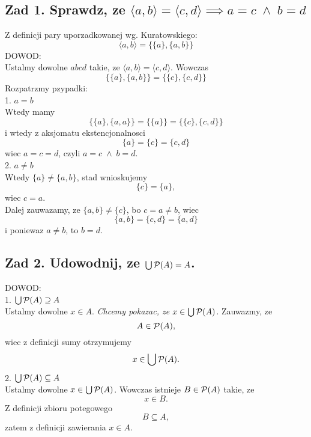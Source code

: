 \documentclass{article}
\begin{document}
\ttfamily
\subsection*{Zad 1. Sprawdz, ze $\langle a, b\rangle = \langle c,d\rangle\implies a=c\;\land\;b=d$}
    Z definicji pary uporzadkowanej wg. Kuratowskiego:
    $$\langle a,b\rangle = \{\{a\}, \{a,b\}\}$$
    DOWOD:\medskip\\
    Ustalmy dowolne $abcd$ takie, ze $\langle a,b\rangle =\langle c,d\rangle$. Wowczas
    $$\{\{a\},\{a,b\}\}=\{\{c\}, \{c,d\}\}$$
    Rozpatrzmy pzypadki:\medskip\\
    {\color{acc}1. $a=b$}\smallskip\\
        Wtedy mamy 
        $$\{\{a\}, \{a,a\}\}=\{\{a\}\}=\{\{c\}, \{c, d\}\}$$
        i wtedy z aksjomatu ekstencjonalnosci
        $$\{a\}=\{c\}=\{c,d\}$$
        wiec $a=c=d$, czyli $a=c\;\land\;b=d$.\medskip\\
    {\color{acc}2. $a\neq b$}\smallskip\\
        Wtedy $\{a\}\neq \{a,b\}$, stad wnioskujemy 
        $$\{c\}=\{a\},$$ 
        wiec $c=a$.\smallskip\\
        Dalej zauwazamy, ze $\{a,b\}\neq\{c\}$, bo $c=a\neq b$, wiec
        $$\{a,b\}=\{c,d\}=\{a,d\}$$
        i poniewaz $a\neq b$, to $b=d$.
\subsection*{Zad 2. Udowodnij, ze $\bigcup\mathcal{P}(A)=A$.}
    DOWOD:\medskip\\
    {\color{acc}1. $\bigcup\mathcal{P}(A)\supseteq A$}\smallskip\\
    Ustalmy dowolne $x\in A$. \emph{Chcemy pokazac, ze $x\in \bigcup\mathcal{P}(A)$.} Zauwazmy, ze 
    $$A\in\mathcal{P}(A),$$ 
    wiec z definicji sumy otrzymujemy
    $$x\in\bigcup\Po(A).\medskip$$
    {\color{acc}2. $\bigcup\mathcal{P}(A)\subseteq A$}\smallskip\\
    Ustalmy dowolne $x\in\bigcup\mathcal{P}(A)$. Wowczas istnieje $B\in \mathcal{P}(A)$ takie, ze 
    $$x\in B.$$ 
    Z definicji zbioru potegowego 
    $$B\subseteq A,$$ 
    zatem z definicji zawierania $x\in A$.
\end{document}
